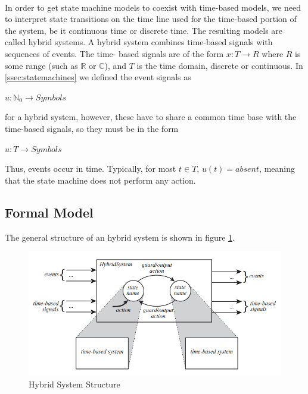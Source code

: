 \paragraph{} In order to get state machine models to coexist with time-based models, we need to interpret state transitions on the time line used for the time-based portion of the system, be it continuous time or discrete time. The resulting models are called hybrid systems. A hybrid system combines time-based signals with sequences of events. The time-
based signals are of the form $x : T \rightarrow R$ where $R$ is some range (such as $\mathbb{R}$ or $\mathbb{C}$), and $T$ is the time domain, discrete or continuous. In \ref{ssec:statemachines} we defined the event signals as 
\begin{center}
$u: \mathbb{N}_{0} \rightarrow Symbols$
\end{center}
for a hybrid system, however, these have to share a common time base with the time-based signals, so they must be in the form 
\begin{center}
$u: T \rightarrow Symbols$
\end{center} Thus, events occur in time. Typically, for most $t \in T$, $u(t) = absent$, meaning that the state machine does not perform any action.

\subsection{Formal Model}

The general structure of an hybrid system is shown in figure \ref{fig:hsstruct}.
\begin{figure}[!ht]
	\centering 
     \includegraphics[width=\textwidth]{Figs/HS.PNG} 
     \caption{Hybrid System Structure} 
     \label{fig:hsstruct} 
\end{figure} 
